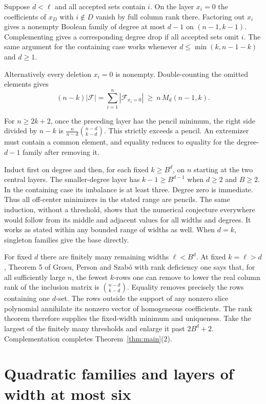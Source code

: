 \documentclass[11pt,letterpaper]{article}
\numberwithin{equation}{section}
\begin{document}
Suppose $d<\ell$ and all accepted sets contain $i$. On the layer $x_i=0$ the coefficients of
$x_D$ with $i\notin D$ vanish by full column rank there. Factoring out $x_i$ gives a nonempty
Boolean family of degree at most $d-1$ on $(n-1,k-1)$. Complementing gives a corresponding
degree drop if all accepted sets omit $i$. The same argument for the containing case works
whenever $d\le\min(k,n-1-k)$ and $d\ge1$.

Alternatively every deletion $x_i=0$ is nonempty. Double-counting the omitted elements gives
\[
(n-k)|\mathcal F|=\sum_{i=1}^n|\mathcal F_{x_i=0}|
\ \ge\ n\,M_{d}(n-1,k).
\]

For $n\ge2k+2$, once the preceding layer has the pencil minimum, the right side divided by
$n-k$ is $\frac{n}{n-d}\binom{n-d}{k-d}$. This strictly exceeds a pencil. An extremizer must
contain a common element, and equality reduces to equality for the degree-$d-1$ family after
removing it.

Induct first on degree and then, for each fixed $k\ge B^d$, on $n$ starting at the two central
layers. The smaller-degree layer has $k-1\ge B^{d-1}$ when $d\ge2$ and $B\ge2$. In the
containing case its imbalance is at least three. Degree zero is immediate. Thus all off-center
minimizers in the stated range are pencils. The same induction, without a threshold, shows
that the numerical conjecture everywhere would follow from its middle and adjacent values for
all widths and degrees. It works as stated within any bounded range of widths as well. When
$d=k$, singleton families give the base directly.

For fixed $d$ there are finitely many remaining widths $\ell<B^d$. At fixed $k=\ell>d$,
Theorem 5 of Grosu, Person and Szabó \cite{gps} with rank deficiency one says that, for all sufficiently
large $n$, the fewest $k$-rows one can remove to lower the real column rank of the inclusion
matrix is $\binom{n-d}{k-d}$. Equality removes precisely the rows containing one $d$-set. The
rows outside the support of any nonzero slice polynomial annihilate its nonzero vector of
homogeneous coefficients. The rank theorem therefore supplies the fixed-width minimum and
uniqueness. Take the largest of the finitely many thresholds and enlarge it past $2B^d+2$.
Complementation completes Theorem~\ref{thm:main}(2).

\section{Quadratic families and layers of width at most six}\label{sec:small}
\end{document}
